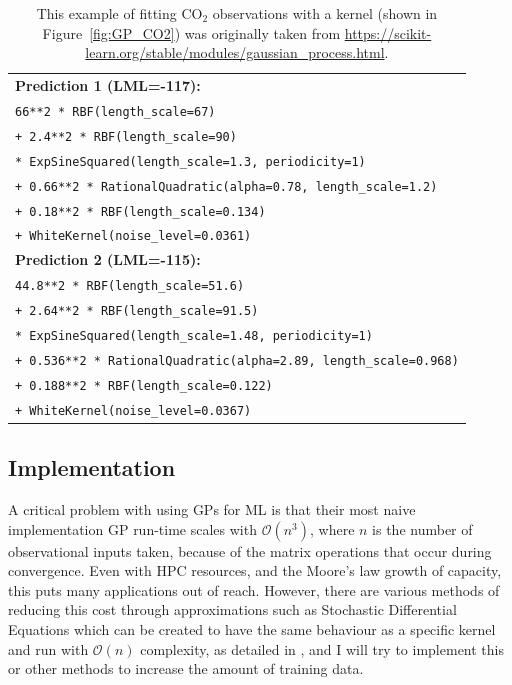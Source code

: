 \documentclass[usenames, dvipsnames, twocolumn]{article}
\begin{document}
 \begin{table}
\begin{tabular}{p{}}
        \textbf{Prediction 1 (LML=-117):}\\
        \texttt{66**2 * RBF(length\_scale=67)}\\
        \texttt{+ 2.4**2 * RBF(length\_scale=90)}\\
        \texttt{* ExpSineSquared(length\_scale=1.3, periodicity=1)}\\
        \texttt{+ 0.66**2 * RationalQuadratic(alpha=0.78, length\_scale=1.2)}\\
        \texttt{+ 0.18**2 * RBF(length\_scale=0.134)}\\
        \texttt{+ WhiteKernel(noise\_level=0.0361)}\\
        \textbf{Prediction 2 (LML=-115):} \\
        \texttt{44.8**2 * RBF(length\_scale=51.6)}\\
        \texttt{+ 2.64**2 * RBF(length\_scale=91.5)}\\
        \texttt{* ExpSineSquared(length\_scale=1.48, periodicity=1)} \\
        \texttt{+ 0.536**2 * RationalQuadratic(alpha=2.89, length\_scale=0.968)}\\
        \texttt{+ 0.188**2 * RBF(length\_scale=0.122)} \\
        \texttt{+ WhiteKernel(noise\_level=0.0367)}
     \end{tabular}
     \caption{This example of fitting CO\(_2\) observations with a kernel
     (shown in Figure~\ref{fig:GP_CO2}) was originally taken from
    \href{https://scikit-learn.org/stable/modules/gaussian_process.html}{https://scikit-learn.org/stable/modules/gaussian\_process.html}.}
    \label{tab:GP_CO2}
     \end{table}


\subsection{Implementation}

A critical problem with using GPs for ML is that their most naive
 implementation GP run-time scales with \(\mathcal{O}(n^3)\),
where \(n\) is the number of observational inputs taken,
 because of the matrix operations that occur during convergence.
Even with HPC resources, and the Moore's law growth of capacity,
 this puts many applications out of reach.
However, there are various methods of reducing this cost through
approximations such as Stochastic Differential Equations which can be created to
have the same behaviour as a specific kernel and run with \(\mathcal{O}(n)\) complexity,
 as detailed in  \cite{marshall2019exploring,sarkka2019applied,titsias2009variational,solin2016stochastic},
  and I will try to implement this
or other methods to increase the amount of training data.
\end{document}
